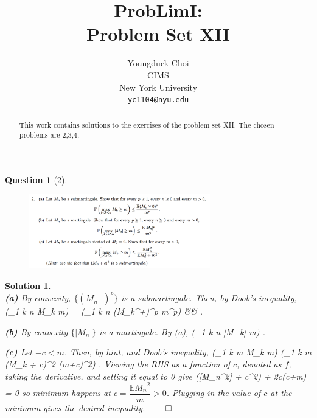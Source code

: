 \documentclass{article} %
\title{ProbLimI: \\
Problem Set XII}
\author{
Youngduck Choi \\
CIMS \\
New York University\\
\texttt{yc1104@nyu.edu} \\
}
\def\eQb#1\eQe{\begin{eqnarray*}#1\end{eqnarray*}}
\theoremstyle{quest}
\newtheorem*{question}{Question}
\newtheorem*{solution}{Solution}
\begin{document}
\maketitle

\begin{abstract}
This work contains solutions to the exercises of the problem set XII. The
chosen problems are 2,3,4.
\end{abstract}

\bigskip

\begin{question}[2]
\hfill
\begin{figure}[h!]
  \centering
    \includegraphics[width=0.7\textwidth]{problim-e12-p2.png}
\end{figure}
\end{question}
\begin{solution} \hfill \\
\textbf{(a)} By convexity, $\{({M_n}^{+})^p\}$ is a submartingale. Then, by Doob's
inequality,
\eQb
\mathbb{P}(_{1 \leq k \leq n} M_k \geq m) = 
(_{1 \leq k \leq n} ({M_k}^{+})^{p} \geq m^{p}) &\leq& 
.
\eQe 

\bigskip

\textbf{(b)} By convexity $\{ | M_n| \}$ is a martingale. By (a),
\eQb
\mathbb{P}(_{1 \leq k \leq n} |M_k| \geq m) \leq 
\dfrac{\mathbb{E}[|M_k|^p}{m^p}. 
\eQe

\bigskip

\textbf{(c)} Let $ - c < m$. Then, by hint, and Doob's inequality,
\eQb
\mathbb{P}(_{1 \leq k \leq m} M_k \leq m) 
\leq {}(_{1 \leq k \leq m} (M_k + c)^2 \geq (m+c)^2) 
\leq {}.
\eQe 
Viewing the RHS as a function of $c$, denoted as $f$, taking the derivative, 
and setting it equal to 0 give 
\eQb
-2([{M_n}^2] + c^2) + 2c(c+m) = 0 
\eQe
so minimum happens at $c = \dfrac{\mathbb{E}{M_n}^{2}}{m} > 0$. Plugging in the
value of $c$ at the minimum gives the desired inequality. \hfill $\qed$


\end{solution}
\end{document}
